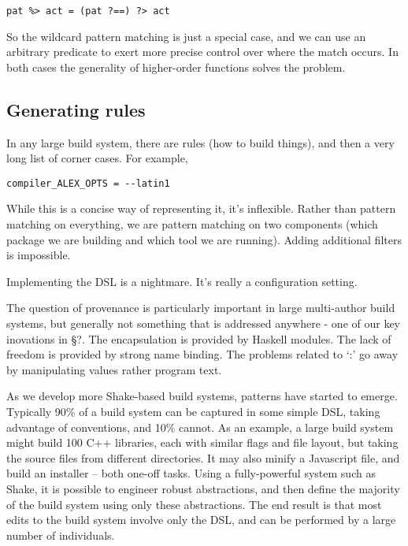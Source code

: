 \begin{verbatim}
pat %> act = (pat ?==) ?> act
\end{verbatim}
\noindent
So the wildcard pattern matching is just a special case, and we can use an
arbitrary predicate to exert more precise control over where the match occurs.
In both cases the generality of higher-order functions solves the problem.

\subsection{Generating rules}


In any large build system, there are rules (how to build things), and then a
very long list of corner cases. For example,

\begin{lstlisting}
compiler_ALEX_OPTS = --latin1
\end{lstlisting}

While this is a concise way of representing it, it's inflexible. Rather than
pattern matching on everything, we are pattern matching on two components (which
package we are building and which tool we are running). Adding additional
filters is impossible.

Implementing the DSL is a nightmare. It's really a configuration setting.

The question of provenance is particularly important in large multi-author build
systems, but generally not something that is addressed anywhere - one of our key
inovations in \S?. The encapsulation is provided by Haskell modules. The lack of
freedom is provided by strong name binding. The problems related to `:' go away
by manipulating values rather program text.


As we develop more Shake-based build systems, patterns have started to emerge.
Typically 90\% of a build system can be captured in some simple DSL, taking
advantage of conventions, and 10\% cannot. As an example, a large build system
might build 100 C++ libraries, each with similar flags and file layout, but
taking the source files from different directories. It may also minify a
Javascript file, and build an installer -- both one-off tasks. Using a
fully-powerful system such as Shake, it is possible to engineer robust
abstractions, and then define the majority of the build system using only these
abstractions. The end result is that most edits to the build system involve only
the DSL, and can be performed by a large number of individuals.

